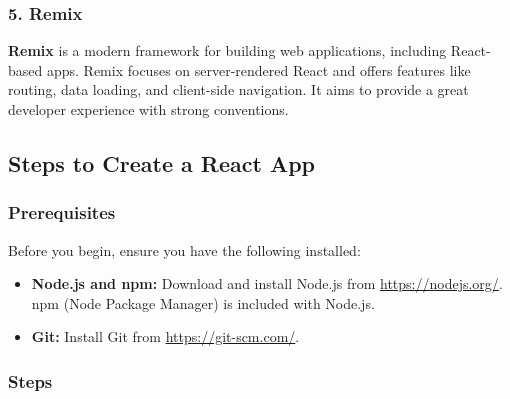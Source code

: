 \documentclass[11pt]{article}
\begin{document}
\subsubsection{5. Remix}

\textbf{Remix} is a modern framework for building web applications, including React-based apps. Remix focuses on server-rendered React and offers features like routing, data loading, and client-side navigation. It aims to provide a great developer experience with strong conventions.



\subsection{Steps to Create a React App}

\subsubsection{Prerequisites}
Before you begin, ensure you have the following installed:
\begin{itemize}
    \item \textbf{Node.js and npm:} Download and install Node.js from \url{https://nodejs.org/}. npm (Node Package Manager) is included with Node.js.
    \item \textbf{Git:} Install Git from \url{https://git-scm.com/}.
\end{itemize}

\subsubsection{Steps}
\end{document}
